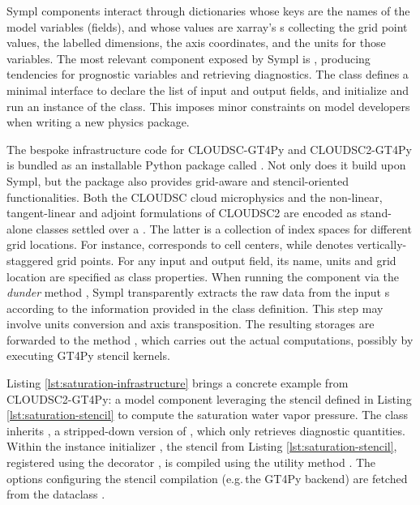 \documentclass[gmd,manuscript,online]{copernicus}
\begin{document}
	Sympl components interact through dictionaries whose keys are the names of the model variables (fields), and whose values are xarray's s \citep{hoyer17} collecting the grid point values, the labelled dimensions, the axis coordinates, and the units for those variables. The most relevant component exposed by Sympl is , producing tendencies for prognostic variables and retrieving diagnostics. The class defines a minimal interface to declare the list of input and output fields, and initialize and run an instance of the class. This imposes minor constraints on model developers when writing a new physics package.

	The bespoke infrastructure code for CLOUDSC-GT4Py and CLOUDSC2-GT4Py is bundled as an installable Python package called . Not only does it build upon Sympl, but the package also provides grid-aware and stencil-oriented functionalities. Both the CLOUDSC cloud microphysics and the non-linear, tangent-linear and adjoint formulations of CLOUDSC2 are encoded as stand-alone  classes settled over a . The latter is a collection of index spaces for different grid locations. For instance,  corresponds to cell centers, while  denotes vertically-staggered grid points. For any input and output field, its name, units and grid location are specified as class properties. When running the component via the \emph{dunder} method , Sympl transparently extracts the raw data from the input s according to the information provided in the class definition. This step may involve units conversion and axis transposition. The resulting storages are forwarded to the method , which carries out the actual computations, possibly by executing GT4Py stencil kernels.

	Listing \ref{lst:saturation-infrastructure} brings a concrete example from CLOUDSC2-GT4Py: a model component leveraging the stencil defined in Listing \ref{lst:saturation-stencil} to compute the saturation water vapor pressure. The class inherits , a stripped-down version of , which only retrieves diagnostic quantities. Within the instance initializer , the stencil from Listing \ref{lst:saturation-stencil}, registered using the decorator , is compiled using the utility method . The options configuring the stencil compilation (e.g.\,the GT4Py backend) are fetched from the dataclass .
\end{document}

